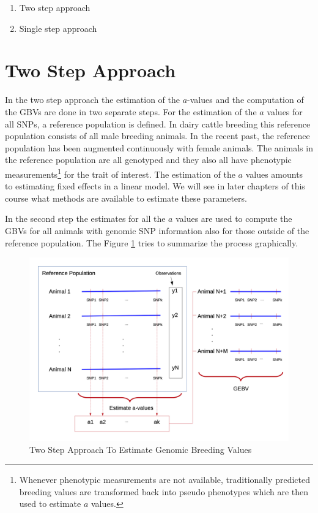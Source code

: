 \documentclass[]{book}
\providecommand{\tightlist}{%
  \setlength{\itemsep}{0pt}\setlength{\parskip}{0pt}}
\theoremstyle{definition}
\theoremstyle{definition}
\theoremstyle{definition}
\theoremstyle{remark}
\begin{document}
\begin{enumerate}
\def\labelenumi{\arabic{enumi}.}
\tightlist
\item
  Two step approach
\item
  Single step approach
\end{enumerate}

\hypertarget{asm-two-step-approach}{%
\section{Two Step Approach}\label{asm-two-step-approach}}

In the two step approach the estimation of the \(a\)-values and the computation of the GBVs are done in two separate steps. For the estimation of the \(a\) values for all SNPs, a reference population is defined. In dairy cattle breeding this reference population consists of all male breeding animals. In the recent past, the reference population has been augmented continuously with female animals. The animals in the reference population are all genotyped and they also all have phenotypic measurements\footnote{Whenever phenotypic measurements are not available, traditionally predicted breeding values are transformed back into pseudo phenotypes which are then used to estimate \(a\) values.} for the trait of interest. The estimation of the \(a\) values amounts to estimating fixed effects in a linear model. We will see in later chapters of this course what methods are available to estimate these parameters.

In the second step the estimates for all the \(a\) values are used to compute the GBVs for all animals with genomic SNP information also for those outside of the reference population. The Figure \ref{fig:twostepgs} tries to summarize the process graphically.

\begin{figure}
\centering
\includegraphics{odg/twostepgs.png}
\caption{\label{fig:twostepgs}Two Step Approach To Estimate Genomic Breeding Values}
\end{figure}
\end{document}
